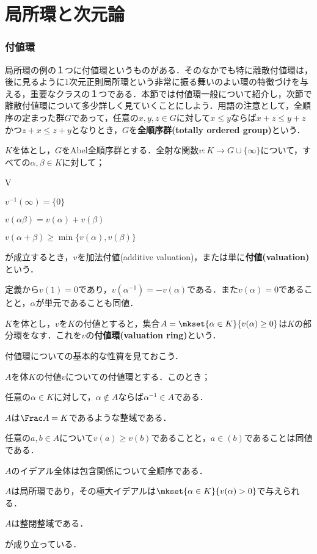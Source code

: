 \newpage
\part[Local ring and Dimension theory]{局所環と次元論}

\section{付値環}

局所環の例の１つに付値環というものがある．そのなかでも特に離散付値環は，後に見るように$1$次元正則局所環という非常に振る舞いのよい環の特徴づけを与える，重要なクラスの１つである．本節では付値環一般について紹介し，次節で離散付値環について多少詳しく見ていくことにしよう．用語の注意として，全順序の定まった群$G$であって，任意の$x,y,z\in G$に対して$x\leq y$ならば$x+z\leq y+z$かつ$z+x\leq z+y$となりとき，$G$を\textbf{全順序群(totally ordered group)}という．

\begin{defi}[付値]
	$K$を体とし，$G$をAbel全順序群とする．全射な関数$v:K\to G\cup\{\infty\}$について，すべての$\alpha,\beta\in K$に対して；
	\begin{defiterm}{V}
		\item $v^{-1}(\infty)=\{0\}$
		\item $v(\alpha\beta)=v(\alpha)+v(\beta)$
		\item $v(\alpha+\beta)\geq\min \{v(\alpha),v(\beta)\}$
	\end{defiterm}
	が成立するとき，$v$を加法付値(additive valuation)，または単に\textbf{付値(valuation)}という．
\end{defi}

定義から$v(1)=0$であり，$v(\alpha^{-1})=-v(\alpha)$である．また$v(\alpha)=0$であることと，$\alpha$が単元であることも同値．

\begin{defi}[付値環]
	$K$を体とし，$v$を$K$の付値とすると，集合$A=\mkset{\alpha\in K}{v(\alpha)\geq0}$は$K$の部分環をなす．これを$v$の\textbf{付値環(valuation ring)}という．
\end{defi}


付値環についての基本的な性質を見ておこう．

\begin{prop}
	$A$を体$K$の付値$v$についての付値環とする．このとき；
	\begin{sakura}
		\item 任意の$\alpha\in K$に対して，$\alpha\not\in A$ならば$\alpha^{-1}\in A$である．
		\item $A$は$\Frac A=K$であるような整域である．
		\item 任意の$a,b\in A$について$v(a)\geq v(b)$であることと，$a\in (b)$であることは同値である．
		\item $A$のイデアル全体は包含関係について全順序である．
		\item $A$は局所環であり，その極大イデアルは$\mkset{\alpha\in K}{v(\alpha)>0}$で与えられる．
		\item $A$は整閉整域である．
	\end{sakura}
	が成り立っている．
\end{prop}

